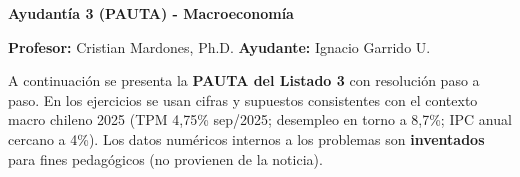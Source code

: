 \documentclass[11pt,addpoints]{article}
\begin{document}
\vspace*{0.05cm}

\begin{center}
{\Large \bfseries Ayudantía 3 (PAUTA) - Macroeconomía \\[0.5cm]}
\end{center}
\textbf{Profesor:} Cristian Mardones, Ph.D. \quad \textbf{Ayudante:} Ignacio Garrido U.
\bigskip

A continuación se presenta la \textbf{PAUTA del Listado 3} con resolución paso a paso. En los ejercicios se usan cifras y supuestos consistentes con el contexto macro chileno 2025 (TPM 4{,}75\% sep/2025; desempleo en torno a 8{,}7\%; IPC anual cercano a 4\%). Los datos numéricos internos a los problemas son \textbf{inventados} para fines pedagógicos (no provienen de la noticia).
\end{document}
